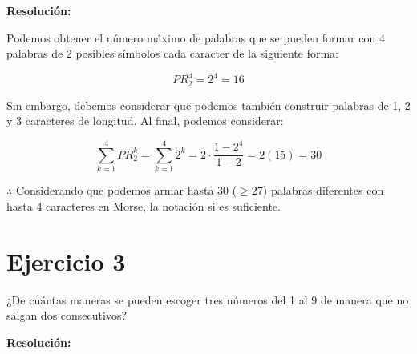 \documentclass{article}
\begin{document}
\bigskip

\textbf{Resolución:}

Podemos obtener el número máximo de palabras que se pueden formar con 4 palabras de 2 posibles símbolos cada caracter de la siguiente forma:

$$PR^{4}_{2} = 2^4 = 16$$

\bigskip

Sin embargo, debemos considerar que podemos también construir palabras de 1, 2 y 3 caracteres de longitud. Al final, podemos considerar:

$$\sum\limits^{4}_{k=1} PR^{k}_{2} = \sum\limits^{4}_{k=1} 2^k = 2 \cdot \dfrac{1 - 2^4}{1 - 2} = 2 (15) = 30$$

\bigskip

$\therefore$ Considerando que podemos armar hasta 30 ($\geq 27$) palabras diferentes con hasta 4 caracteres en Morse, la notación si es suficiente.

\newpage

\section*{Ejercicio 3}

¿De cuántas maneras se pueden escoger tres números del 1 al 9 de manera que no salgan
dos consecutivos?

\bigskip

\textbf{Resolución:}
\end{document}

